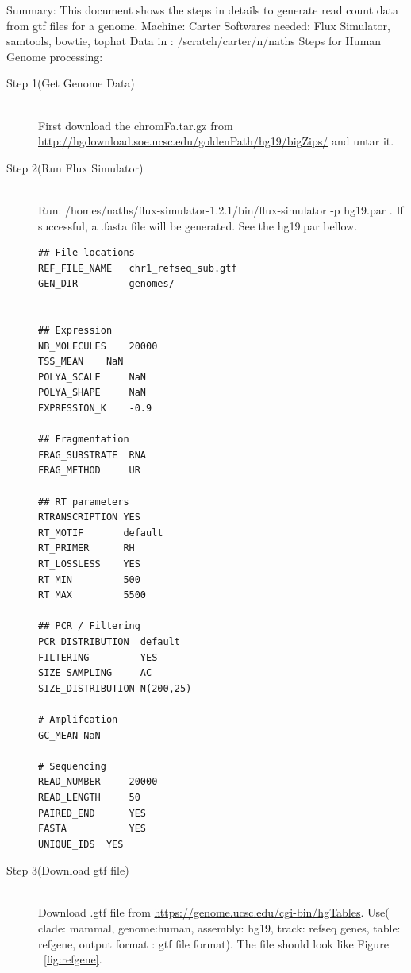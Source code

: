 \documentclass{article}
\begin{document}
 
Summary: This document shows the steps in details to generate read count data from gtf files for a genome.\newline
Machine: Carter \newline
Softwares needed: Flux Simulator, samtools, bowtie, tophat \newline
Data in : /scratch/carter/n/naths \newline
Steps for Human Genome processing:\newline
\begin{description}
  \item[Step 1(Get Genome Data)]\hfill \\
  First download the  chromFa.tar.gz from  \url{http://hgdownload.soe.ucsc.edu/goldenPath/hg19/bigZips/} and untar it. \newline  

  \item[Step 2(Run Flux Simulator)] \hfill \\
Run:\newline
/homes/naths/flux-simulator-1.2.1/bin/flux-simulator -p hg19.par . \newline
If successful, a .fasta file will be generated. See the hg19.par bellow.

\begin{verbatim}
## File locations
REF_FILE_NAME   chr1_refseq_sub.gtf
GEN_DIR         genomes/


## Expression
NB_MOLECULES    20000
TSS_MEAN	NaN
POLYA_SCALE     NaN
POLYA_SHAPE     NaN
EXPRESSION_K	-0.9

## Fragmentation
FRAG_SUBSTRATE  RNA
FRAG_METHOD     UR

## RT parameters
RTRANSCRIPTION YES
RT_MOTIF       default
RT_PRIMER      RH
RT_LOSSLESS    YES
RT_MIN         500
RT_MAX         5500

## PCR / Filtering
PCR_DISTRIBUTION  default
FILTERING         YES
SIZE_SAMPLING     AC
SIZE_DISTRIBUTION N(200,25)

# Amplifcation
GC_MEAN	NaN

# Sequencing
READ_NUMBER     20000
READ_LENGTH     50
PAIRED_END      YES
FASTA           YES
UNIQUE_IDS	YES
\end{verbatim}


  \item[Step 3(Download gtf file)]  \hfill \\
Download .gtf file from \url{https://genome.ucsc.edu/cgi-bin/hgTables}. Use( clade: mammal, genome:human, assembly: hg19, track: refseq genes, table: refgene, output format : gtf file format).
The file should look like Figure ~\ref{fig:refgene}.


\end{description}
\end{document}
